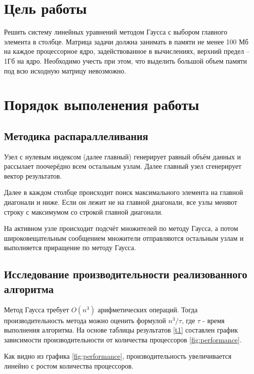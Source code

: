 	\section{Цель работы}
		Решить систему линейных уравнений методом Гаусса с выбором главного элемента в столбце. Матрица задачи должна занимать в памяти не менее 100 Мб на каждое процессорное ядро, задействованное в вычислениях, верхний предел – 1Гб на ядро. Необходимо учесть при этом, что выделить большой объем памяти под всю исходную матрицу невозможно.
	\section{Порядок выполенения работы}
		\subsection{Методика распараллеливания}
			Узел с нулевым индексом (далее главный) генерирует равный объём данных и рассылает поочерёдно всем остальным узлам. Далее главный узел сгенерирует вектор результатов.
			
			Далее в каждом столбце происходит поиск максимального элемента на главной диагонали и ниже. Если он лежит не на главной диагонали, все узлы меняют строку с максимумом со строкой главной диагонали.
			
			На активном узле происходит подсчёт множителей по методу Гаусса, а потом широковещательным сообщением множители отправляются остальным узлам и выполняется приращение по методу Гаусса.
			
		\subsection{Исследование производительности реализованного алгоритма}
			
			Метод Гаусса требует $ O(n^3) $ арифметических операций. Тогда производительность метода можно оценить формулой $ n^3/\tau $, где $ \tau $ - время выполнения алгоритма. На основе таблицы результатов \ref{t1} составлен график зависимости производительности от количества процессоров \ref{fig:performance}. 
			
			Как видно из графика \ref{fig:performance}, производительность увеличивается линейно с ростом количества процессоров.
			
